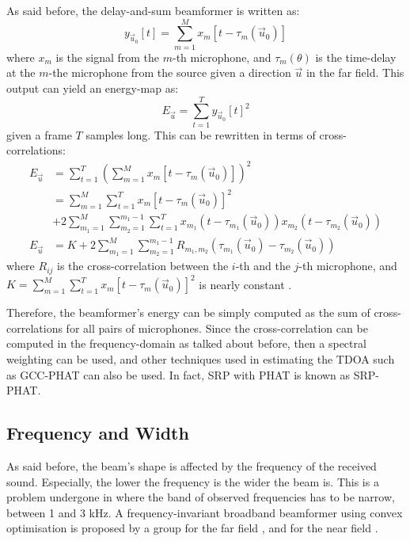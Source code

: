 \documentclass[notitlepage]{report}
\begin{document}
As said before, the delay-and-sum beamformer is written as:
\begin{equation}
y_{\vec{u}_0}[t] = \sum_{m=1}^M x_m[t-\tau_m(\vec{u}_0)] 
\end{equation}
where $x_m$ is the signal from the $m$-th microphone, and $\tau_m(\theta)$ is the time-delay at the $m$-the microphone from the source given a direction $\vec{u}$ in the far field. This output can yield an energy-map as:
\begin{equation}
E_{\vec{u}} = \sum_{t=1}^T y_{\vec{u}_0}[t]^2
\end{equation}
given a frame $T$ samples long. This can be rewritten in terms of cross-correlations:
\begin{equation}
\begin{split}
E_{\vec{u}} &= \sum_{t=1}^T \left( \sum_{m=1}^M x_m[t-\tau_m(\vec{u}_0)] \right)^2 \\
&= \sum_{m=1}^{M} \sum_{t=1}^T x_m[t - \tau_m(\vec{u}_0)]^2 \\
&+ 2 \sum_{m_1=1}^M \sum_{m_2=1}^{m_1-1} 
\sum_{t=1}^T x_{m_1}\left(t - \tau_{m_1}(\vec{u}_0)\right) x_{m_2}\left(t - \tau_{m_2}(\vec{u}_0)\right) \\
E_{\vec{u}} &= K 
+ 2 \sum_{m_1=1}^M \sum_{m_2=1}^{m_1-1} R_{m_1,m_2} (\tau_{m_1}(\vec{u}_0) - \tau_{m_2}(\vec{u}_0))
\end{split}
\end{equation}
where $R_{ij}$ is the cross-correlation between the $i$-th and the $j$-th microphone, and $K = \sum_{m=1}^{M} \sum_{t=1}^T x_m[t - \tau_m(\vec{u}_0)]^2$ is nearly constant \cite{valin_localization_2004} \cite{valin_robust_2007}. 

Therefore, the beamformer's energy can be simply computed as the sum of cross-correlations for all pairs of microphones. Since the cross-correlation can be computed in the frequency-domain as talked about before, then a spectral weighting can be used, and other techniques used in estimating the TDOA such as GCC-PHAT can also be used. In fact, SRP with PHAT is known as SRP-PHAT.

\subsection{Frequency and Width}

As said before, the beam's shape is affected by the frequency of the received sound. Especially, the lower the frequency is the wider the beam is. This is a problem undergone in \cite{tamai_three_2005} where the band of observed frequencies has to be narrow, between 1 and 3 \si{kHz}. A frequency-invariant broadband beamformer using convex optimisation is proposed by a group for the far field \cite{argentieri_experimental_2005}, \cite{argentieri_prototyping_2005} and for the near field \cite{argentieri_modal_2006}.
\end{document}
